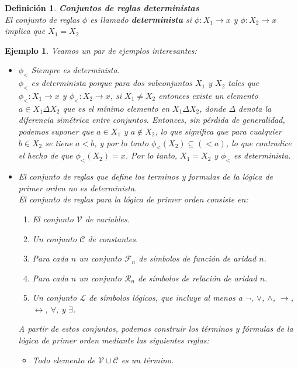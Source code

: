 \documentclass[executivepaper]{article}
\newtheorem{defi}[propo]{Definición}
\newtheorem{ejemplo}[propo]{Ejemplo}
\begin{document}
\begin{defi}\textbf{Conjuntos de reglas deterministas}\\
    El conjunto de reglas $\phi$ es llamado \textbf{determinista} si $\phi:X_1\rightarrow x$ y $\phi:X_2\rightarrow x$ implica que $X_1=X_2$
\end{defi}
\begin{ejemplo}
Veamos un par de ejemplos interesantes:\\
    \begin{itemize}
        \item $\phi_<$ Siempre es determinista.\\
        $\phi_< $ es determinista porque para dos subconjuntos $X_1$ y $X_2$ tales que $\phi_< : X_1\rightarrow x$ y $\phi_< : X_2\rightarrow x$, si $X_1 \neq X_2$ entonces existe un elemento $a \in X_1\Delta X_2$ que es el mínimo elemento en $X_1\Delta X_2$, donde $\Delta$ denota la diferencia simétrica entre conjuntos. Entonces, sin pérdida de generalidad, podemos suponer que $a\in X_1$ y $a\notin X_2$, lo que significa que para cualquier $b \in X_2$ se tiene $a<b$, y por lo tanto $\phi_<(X_2) \subseteq (<a)$, lo que contradice el hecho de que $\phi_<(X_2) = x$. Por lo tanto, $X_1 = X_2$ y $\phi_<$ es determinista.
        \item El conjunto de reglas que define los terminos y formulas de la lógica de primer orden no es determinista.\\
        El conjunto de reglas para la lógica de primer orden consiste en:
        \begin{enumerate}
            \item El conjunto $\mathcal{V}$ de variables.
            \item Un conjunto $\mathcal{C}$ de constantes.
            \item Para cada $n$ un conjunto $\mathcal{F}_n$ de símbolos de función de aridad $n$.
            \item Para cada $n$ un conjunto $\mathcal{R}_n$ de símbolos de relación de aridad $n$.
            \item Un conjunto $\mathcal{L}$ de símbolos lógicos, que incluye al menos a $\neg$, $\vee$, $\wedge$, $\rightarrow$, $\leftrightarrow$, $\forall$, y $\exists$.
        \end{enumerate}
        A partir de estos conjuntos, podemos construir los términos y fórmulas de la lógica de primer orden mediante las siguientes reglas:
        \begin{itemize}
            \item Todo elemento de $\mathcal{V} \cup \mathcal{C}$ es un término.

\end{itemize}
\end{itemize}
\end{ejemplo}
\end{document}
